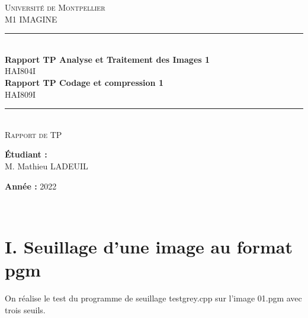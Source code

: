 \usepackage{}\documentclass[oneside]{book}
\begin{document}
\begin{titlepage}
\newcommand{\HRule}{\rule{\linewidth}{0.5mm}} 
\center

\textsc{\LARGE Université de Montpellier}\\[0.2cm] 
\textsc{\Large M1 IMAGINE}\\[1.5cm] 

\HRule \\[0.5cm]
{ \huge \bfseries Rapport TP Analyse et Traitement des Images 1 }\\[0.4cm]
{   HAI804I }\\[0.2cm]
{ \huge \bfseries Rapport TP Codage et compression 1 }\\[0.4cm]
{   HAI809I }\\[0.2cm]
\HRule \\[1.2cm]
 
\textsc{\large Rapport de TP }\\[0.1cm] 

\begin{minipage}[t]{0.5\textwidth}
    \begin{flushleft}
        \textbf{Étudiant :}\\
        M. Mathieu \textsc{LADEUIL}\\
        \vspace*{0.5cm}

    \end{flushleft}
\end{minipage}%
%
\begin{minipage}[t]{0.5\textwidth}
    \begin{flushright}
        \vspace*{1.8cm}
        \textbf{Année :} 2022\\
    \end{flushright}
\end{minipage}\\[3cm]

\newpage

\end{titlepage}
 \section*{I. Seuillage d'une image au format pgm}
 
On réalise le test du programme de seuillage testgrey.cpp sur l'image 01.pgm avec trois seuils.
\end{document}
